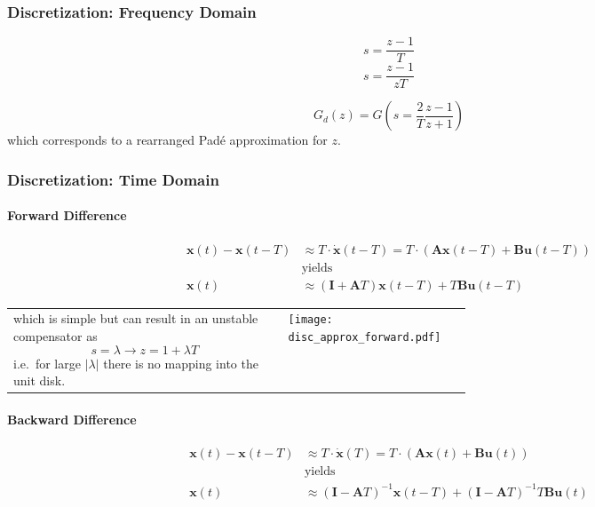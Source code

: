 \subsubsection{Discretization: Frequency Domain}\label{disc::tustin}
\noindent\begin{equation*}
    s = \frac{z-1}{T}
\end{equation*}
\noindent\begin{equation*}
    s = \frac{z-1}{zT}
\end{equation*}

\begin{equation*}
    G_{d}(z)=G\left(s=\frac2T\frac{z-1}{z+1}\right)
\end{equation*}
which corresponds to a rearranged Padé approximation for $z$.

\subsubsection{Discretization: Time Domain}

\paragraph{Forward Difference}
\noindent\begin{align*}
    \mathbf{x}(t)-\mathbf{x}(t-T) & \approx T\cdot\dot{\mathbf{x}}(t-T) =T\cdot(\mathbf{Ax}(t-T)+\mathbf{Bu}(t-T)) \\
                                  & \text{yields}                                                                  \\
    \mathbf{x}(t)                 & \approx(\mathbf{I}+\mathbf{A}T)\mathbf{x}(t-T)+T\mathbf{Bu}(t-T)
\end{align*}

\begin{tabularx}{\linewidth}{@{}m{0.6\linewidth}X@{}}
    which is simple but can result in an unstable compensator as
    \begin{equation*}
        s=\lambda \rightarrow z=1+\lambda T
    \end{equation*}
    i.e.\ for large $|\lambda|$ there is no mapping into the unit disk.
     &
    \texttt{[image: disc\_approx\_forward.pdf]}
\end{tabularx}

\paragraph{Backward Difference}
\noindent\begin{align*}
    \mathbf{x}(t)-\mathbf{x}(t-T) & \approx T\cdot\dot{\mathbf{x}}(T) =T\cdot(\mathbf{Ax}(t)+\mathbf{Bu}(t))                             \\
                                  & \text{yields}                                                                                        \\
    \mathbf{x}(t)                 & \approx{(\mathbf{I}-\mathbf{A}T)}^{-1}\mathbf{x}(t-T)+{(\mathbf{I}-\mathbf{A}T)}^{-1}T\mathbf{Bu}(t)
\end{align*}

